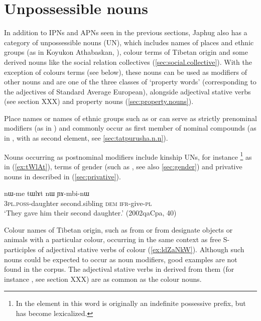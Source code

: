 \section{Unpossessible nouns} \label{sec:unpossessible.nouns}
In addition to IPNs and APNs seen in the previous sections, Japhug also has a category of unpossessible nouns (UN), which includes names of places and ethnic groups (as in Koyukon Athabaskan, \citealt[651]{thompson96koyukon}), colour terms of Tibetan origin and some derived nouns like the social relation collectives (\ref{sec:social.collective}). With the exception of colours terms (see below), these nouns can be used as modifiers of other nouns and are one of the three classes of `property words' (corresponding to the adjectives of Standard Average European),  alongside adjectival stative verbs (see section XXX) and property nouns (\ref{sec:property.nouns}).

Place names  or names of ethnic groups such as  or  can serve as strictly prenominal modifiers (as in ) and commonly occur as first member of nominal compounds (as in , with  as second element, see \ref{sec:tatpurusha.n.n}).

Nouns occurring as postnominal modifiers include kinship UNs, for instance \footnote{In  the  element in this word is originally an indefinite possessive prefix, but has become lexicalized.} as in (\ref{ex:tWlAt}), terms of gender (such as , see also \ref{sec:gender}) and  privative nouns in  described in (\ref{sec:privative}). 

\begin{exe}
\ex \label{ex:tWlAt}
\gll  nɯ-me tɯlɤt nɯ ɲɤ-mbi-nɯ \\
\textsc{3pl.poss}-daughter second.sibling \textsc{dem} \textsc{ifr}-give-\textsc{pl} \\
\glt `They gave him their second daughter.' (2002qaCpa, 40)
\end{exe} 
  
Colour names of Tibetan origin, such as  from  or  from  designate objects or animals with a particular colour, occurring in the same context as free S-participles of adjectival stative verbs of colour (\ref{ex:ldZaNkW}). Although such nouns could be expected to occur as noun modifiers, good examples are not found in the corpus. The adjectival stative verbs in  derived from them (for instance , see section XXX) are as common as the colour nouns.
 
